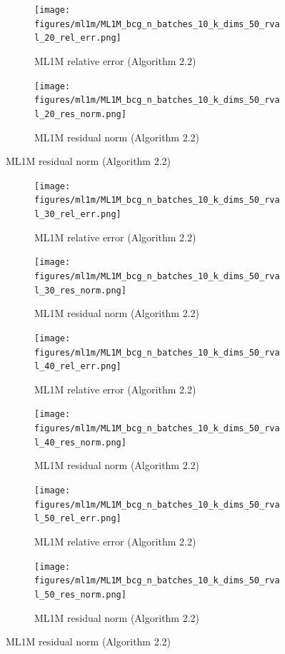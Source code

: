\begin{figure}[H]
\begin{subfigure}[b]{0.48\textwidth}
  \end{subfigure}
  \hfill
  \begin{subfigure}[b]{0.48\textwidth}
    \centering
    \texttt{[image: figures/ml1m/ML1M\_bcg\_n\_batches\_10\_k\_dims\_50\_rval\_20\_rel\_err.png]}
    \caption{ML1M relative error (Algorithm 2.2)}
  \end{subfigure}
  \hfill
  \begin{subfigure}[b]{0.48\textwidth}
    \centering
    \texttt{[image: figures/ml1m/ML1M\_bcg\_n\_batches\_10\_k\_dims\_50\_rval\_20\_res\_norm.png]}
    \caption{ML1M residual norm (Algorithm 2.2)}
  \end{subfigure}
\end{figure}

\begin{figure}\ContinuedFloat
  \begin{subfigure}[b]{0.48\textwidth}
    \centering
    \texttt{[image: figures/ml1m/ML1M\_bcg\_n\_batches\_10\_k\_dims\_50\_rval\_30\_rel\_err.png]}
    \caption{ML1M relative error (Algorithm 2.2)}
  \end{subfigure}
  \hfill
  \begin{subfigure}[b]{0.48\textwidth}
    \centering
    \texttt{[image: figures/ml1m/ML1M\_bcg\_n\_batches\_10\_k\_dims\_50\_rval\_30\_res\_norm.png]}
    \caption{ML1M residual norm (Algorithm 2.2)}
  \end{subfigure}
    \begin{subfigure}[b]{0.48\textwidth}
    \centering
    \texttt{[image: figures/ml1m/ML1M\_bcg\_n\_batches\_10\_k\_dims\_50\_rval\_40\_rel\_err.png]}
    \caption{ML1M relative error (Algorithm 2.2)}
  \end{subfigure}
  \hfill
  \begin{subfigure}[b]{0.48\textwidth}
    \centering
    \texttt{[image: figures/ml1m/ML1M\_bcg\_n\_batches\_10\_k\_dims\_50\_rval\_40\_res\_norm.png]}
    \caption{ML1M residual norm (Algorithm 2.2)}
  \end{subfigure}
    \begin{subfigure}[b]{0.48\textwidth}
    \centering
    \texttt{[image: figures/ml1m/ML1M\_bcg\_n\_batches\_10\_k\_dims\_50\_rval\_50\_rel\_err.png]}
    \caption{ML1M relative error (Algorithm 2.2)}
  \end{subfigure}
  \hfill
  \begin{subfigure}[b]{0.48\textwidth}
    \centering
    \texttt{[image: figures/ml1m/ML1M\_bcg\_n\_batches\_10\_k\_dims\_50\_rval\_50\_res\_norm.png]}
    \caption{ML1M residual norm (Algorithm 2.2)}
  \end{subfigure}
 \end{figure}
 

